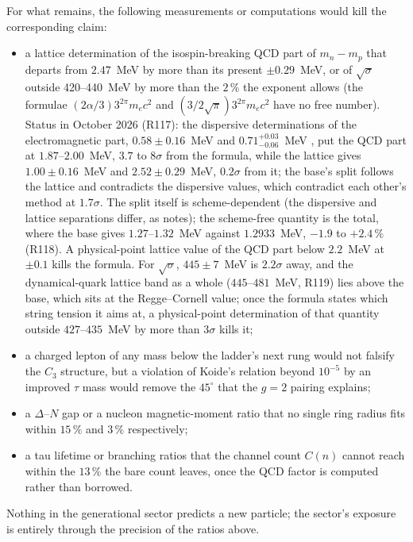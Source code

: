 \documentclass[11pt,a4paper]{article}
\theoremstyle{plain}
\theoremstyle{remark}
\begin{document}
For what remains, the following measurements or computations would kill the corresponding claim:
\begin{itemize}[nosep]
\item a lattice determination of the isospin-breaking QCD part of $m_n - m_p$ that departs from
$2.47$~MeV by more than its present $\pm 0.29$~MeV, or of $\sqrt\sigma$ outside 420--440~MeV by more
than the $2\,\%$ the exponent allows (the formulae $(2\alpha/3)3^{2\pi} m_e c^2$ and
$(3/2\sqrt\pi)3^{2\pi} m_e c^2$ have no free number). Status in October 2026 (R117): the dispersive
determinations of the electromagnetic part, $0.58 \pm 0.16$~MeV \cite{glr} and
$0.71^{+0.03}_{-0.06}$~MeV \cite{sumrule2026}, put the QCD part at $1.87$--$2.00$~MeV, $3.7$ to
$8\sigma$ from the formula, while the lattice \cite{bmw} gives $1.00 \pm 0.16$~MeV and $2.52 \pm
0.29$~MeV, $0.2\sigma$ from it; the base's split follows the lattice and contradicts the dispersive
values, which contradict each other's method at $1.7\sigma$. The split itself is scheme-dependent
(the dispersive and lattice separations differ, as \cite{sumrule2026} notes); the scheme-free
quantity is the total, where the base gives $1.27$--$1.32$~MeV against $1.2933$~MeV, $-1.9$ to
$+2.4\,\%$ (R118). A physical-point lattice value of the
QCD part below $2.2$~MeV at $\pm 0.1$ kills the formula. For $\sqrt\sigma$, $445 \pm 7$~MeV
\cite{bulava} is $2.2\sigma$ away, and the dynamical-quark lattice band as a whole ($445$--$481$~MeV, R119)
lies above the base, which sits at the Regge--Cornell value; once the formula states which string tension it
aims at, a physical-point determination of that quantity outside $427$--$435$~MeV by more than $3\sigma$ kills
it;
\item a charged lepton of any mass below the ladder's next rung would not falsify the $C_3$
structure, but a violation of Koide's relation beyond $10^{-5}$ by an improved $\tau$ mass would
remove the $45^\circ$ that the $g = 2$ pairing explains;
\item a $\Delta$--$N$ gap or a nucleon magnetic-moment ratio that no single ring radius fits within
$15\,\%$ and $3\,\%$ respectively;
\item a tau lifetime or branching ratios that the channel count $C(n)$ cannot reach within the
$13\,\%$ the bare count leaves, once the QCD factor is computed rather than borrowed.
\end{itemize}
Nothing in the generational sector predicts a new particle; the sector's exposure is entirely
through the precision of the ratios above.
\end{document}
